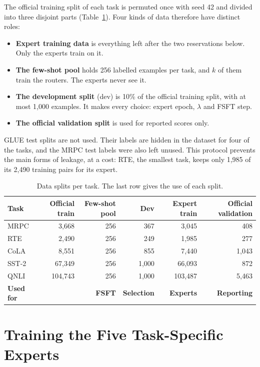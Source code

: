 The official training split of each task is permuted once with seed 42 and divided into three disjoint parts (Table~\ref{tab:split}). Four kinds of data therefore have distinct roles:

\begin{itemize}
  \item \textbf{Expert training data} is everything left after the two reservations below. Only the experts train on it.
  \item \textbf{The few-shot pool} holds 256 labelled examples per task, and $k$ of them train the routers. The experts never see it.
  \item \textbf{The development split} (dev) is 10\% of the official training split, with at most 1,000 examples. It makes every choice: expert epoch, $\lambda$ and FSFT step.
  \item \textbf{The official validation split} is used for reported scores only.
\end{itemize}

GLUE test splits are not used. Their labels are hidden in the dataset for four of the tasks, and the MRPC test labels were also left unused. This protocol prevents the main forms of leakage, at a cost: RTE, the smallest task, keeps only 1,985 of its 2,490 training pairs for its expert.

\begin{table}[htbp]
  \centering\tablestyle
  \caption{Data splits per task. The last row gives the use of each split.}
  \label{tab:split}
  \begin{tabular}{l r r r r r}
    \toprule
    Task & Official train & Few-shot pool & Dev & Expert train & Official validation\\
    \midrule
    MRPC & 3,668 & 256 & 367 & 3,045 & 408\\
    RTE & 2,490 & 256 & 249 & 1,985 & 277\\
    CoLA & 8,551 & 256 & 855 & 7,440 & 1,043\\
    SST-2 & 67,349 & 256 & 1,000 & 66,093 & 872\\
    QNLI & 104,743 & 256 & 1,000 & 103,487 & 5,463\\
    \midrule
    \textbf{Used for} & & \textbf{FSFT} & \textbf{Selection} & \textbf{Experts} & \textbf{Reporting}\\
    \bottomrule
  \end{tabular}
\end{table}

\section{Training the Five Task-Specific Experts}

